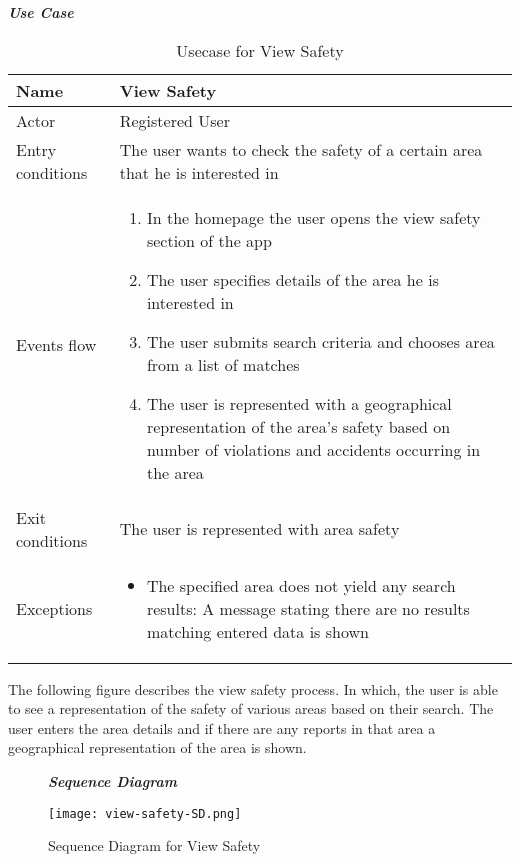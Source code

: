 
\begin{table}[H]
\begin{flushleft}\emph{\textbf{Use Case}}\end{flushleft}
\footnotesize
\centering
\settowidth{}
\setlength\extrarowheight{2pt}
\begin{tabulary}{\textwidth}{|J|J|}
\hline
Name  & View Safety \\
\hline
Actor & Registered User \\
\hline
Entry conditions & The user wants to check the safety of a certain area that he is interested in \\
\hline
Events flow & 
\begin{minipage}[t]{0.7\textwidth}
\begin{enumerate} 
\item In the homepage the user opens the view safety section of the app
\item The user specifies details of the area he is interested in
\item The user submits search criteria and chooses area from a list of matches
\item The user is represented with a geographical representation of the area’s safety based on number of violations and accidents occurring in the area
\end{enumerate}
\end{minipage}\\
\hline
Exit conditions  & The user is represented with area safety\\
\hline
Exceptions       & 
\begin{minipage}[t]{0.8\textwidth}
\begin{itemize} 
\item The specified area does not yield any search results: A message stating there are no results matching entered data is shown
\end{itemize}
\end{minipage}\\
\hline
\end{tabulary}
\caption{\label{tab:Usecase-View-Safety}Usecase for View Safety}
\end{table}

The following figure describes the view safety process. In which, the user is able to see a representation of the safety of various areas based on their search. The user enters the area details and if there are any reports in that area a geographical representation of the area is shown.

\begin{figure}[H]
\begin{flushleft}\emph{\textbf{Sequence Diagram}}\end{flushleft}
\caption{Sequence Diagram for View Safety}
\label{fig:SD-View-Safety}
\centering
\texttt{[image: view-safety-SD.png]}
\end{figure}


